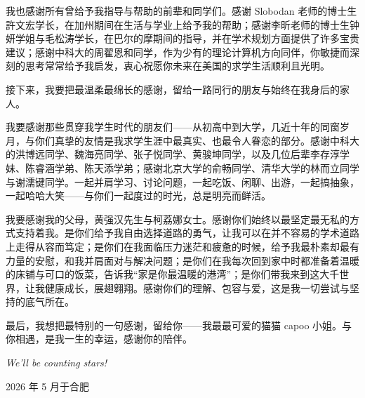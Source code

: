我也感谢所有曾给予我指导与帮助的前辈和同学们。感谢 Slobodan 老师的博士生許文宏学长，在加州期间在生活与学业上给予我的帮助；感谢李昕老师的博士生钟妍学姐与毛松涛学长，在巴尔的摩期间的指导，并在学术规划方面提供了许多宝贵建议；感谢中科大的周翟恩和同学，作为少有的理论计算机方向同伴，你敏捷而深刻的思考常常给予我启发，衷心祝愿你未来在美国的求学生活顺利且光明。

接下来，我要把最温柔最绵长的感谢，留给一路同行的朋友与始终在我身后的家人。

我要感谢那些贯穿我学生时代的朋友们——从初高中到大学，几近十年的同窗岁月，与你们真挚的友情是我求学生涯中最真实、也最令人眷恋的部分。感谢中科大的洪博远同学、魏海亮同学、张子悦同学、黄骏坤同学，以及几位后辈李存淳学妹、陈睿涵学弟、陈天添学弟；感谢北京大学的俞畅同学、清华大学的林而立同学与谢濡键同学。一起并肩学习、讨论问题，一起吃饭、闲聊、出游，一起搞抽象，一起哈哈大笑——与你们一起度过的时光，总是明亮而鲜活。

我要感谢我的父母，黄强汉先生与柯荔娜女士。感谢你们始终以最坚定最无私的方式支持着我。是你们给予我自由选择道路的勇气，让我可以在并不容易的学术道路上走得从容而笃定；是你们在我面临压力迷茫和疲惫的时候，给予我最朴素却最有力量的安慰，和我并肩面对与解决问题；是你们在我每次回到家中时都准备着温暖的床铺与可口的饭菜，告诉我“家是你最温暖的港湾”；是你们带我来到这大千世界，让我健康成长，展翅翱翔。感谢你们的理解、包容与爱，这是我一切尝试与坚持的底气所在。

最后，我想把最特别的一句感谢，留给你——我最最可爱的猫猫 capoo 小姐。与你相遇，是我一生的幸运，感谢你的陪伴。


\centering \textit{We'll be counting stars!}

\medskip

\hfill{2026 年 5 月于合肥}